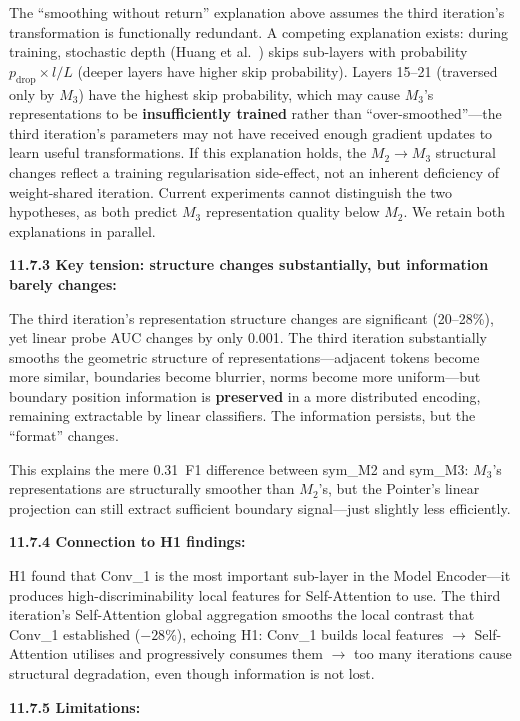 \documentclass[10pt]{article}
\newcommand{\FieldLabel}[1]{%
 {\bfseries #1:}\par
}
\begin{document}
The ``smoothing without return'' explanation above assumes the third iteration's transformation is functionally redundant. A competing explanation exists: during training, stochastic depth (Huang et al.~\cite{huang2016stochastic}) skips sub-layers with probability $p_{\text{drop}} \times l/L$ (deeper layers have higher skip probability). Layers 15--21 (traversed only by $M_3$) have the highest skip probability, which may cause $M_3$'s representations to be \textbf{insufficiently trained} rather than ``over-smoothed''---the third iteration's parameters may not have received enough gradient updates to learn useful transformations. If this explanation holds, the $M_2 \to M_3$ structural changes reflect a training regularisation side-effect, not an inherent deficiency of weight-shared iteration. Current experiments cannot distinguish the two hypotheses, as both predict $M_3$ representation quality below $M_2$. We retain both explanations in parallel.

\FieldLabel{11.7.3 Key tension: structure changes substantially, but information barely changes}

The third iteration's representation structure changes are significant (20--28\%), yet linear probe AUC changes by only 0.001. The third iteration substantially smooths the geometric structure of representations---adjacent tokens become more similar, boundaries become blurrier, norms become more uniform---but boundary position information is \textbf{preserved} in a more distributed encoding, remaining extractable by linear classifiers. The information persists, but the ``format'' changes.

This explains the mere 0.31~F1 difference between sym\_M2 and sym\_M3: $M_3$'s representations are structurally smoother than $M_2$'s, but the Pointer's linear projection can still extract sufficient boundary signal---just slightly less efficiently.

\FieldLabel{11.7.4 Connection to H1 findings}

H1 found that Conv\_1 is the most important sub-layer in the Model Encoder---it produces high-discriminability local features for Self-Attention to use. The third iteration's Self-Attention global aggregation smooths the local contrast that Conv\_1 established ($-28\%$), echoing H1: Conv\_1 builds local features $\to$ Self-Attention utilises and progressively consumes them $\to$ too many iterations cause structural degradation, even though information is not lost.

\FieldLabel{11.7.5 Limitations}
\end{document}
